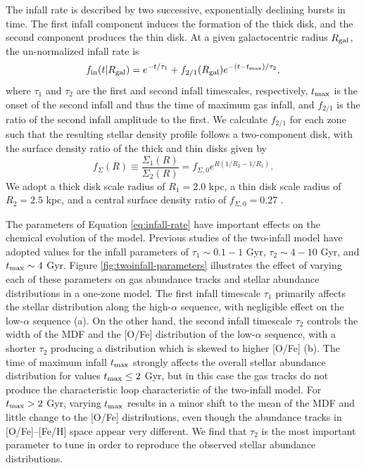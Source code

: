 \documentclass[twocolumn,twocolappendix,linenumbers]{aastex631}
\begin{document}
The infall rate is described by two successive, exponentially declining bursts in time. The first infall component induces the formation of the thick disk, and the second component produces the thin disk. At a given galactocentric radius $R_{\rm gal}$, the un-normalized infall rate is
\begin{equation}
    \label{eq:twoinfall-ifr}
    f_{\rm in}(t|R_{\rm gal}) = e^{-t/\tau_1} + f_{2/1}(R_{\rm gal}) e^{-(t-t_{\rm max})/\tau_2},
\end{equation}
where $\tau_1$ and $\tau_2$ are the first and second infall timescales, respectively, $t_{\rm max}$ is the onset of the second infall and thus the time of maximum gas infall, and $f_{2/1}$ is the ratio of the second infall amplitude to the first. We calculate $f_{2/1}$ for each zone such that the resulting stellar density profile follows a two-component disk, with the surface density ratio of the thick and thin disks given by
\begin{equation}
    f_\Sigma(R) \equiv \frac{\Sigma_1(R)}{\Sigma_2(R)} = f_{\Sigma,0} e^{R(1/R_2 - 1/R_1)}.
\end{equation}
We adopt a thick disk scale radius of $R_1=2.0$ kpc, a thin disk scale radius of $R_2=2.5$ kpc, and a central surface density ratio of $f_{\Sigma,0}=0.27$ \citep{bland-hawthorn_galaxy_2016}.

The parameters of Equation \ref{eq:infall-rate} have important effects on the chemical evolution of the model. Previous studies of the two-infall model have adopted values for the infall parameters of $\tau_1\sim0.1-1$ Gyr, $\tau_2\sim4-10$ Gyr, and $t_{\rm max}\sim4$ Gyr. Figure \ref{fig:twoinfall-parameters} illustrates the effect of varying each of these parameters on gas abundance tracks and stellar abundance distributions in a one-zone model. The first infall timescale $\tau_1$ primarily affects the stellar distribution along the high-$\alpha$ sequence, with negligible effect on the low-$\alpha$ sequence (a). On the other hand, the second infall timescale $\tau_2$ controls the width of the MDF and the [O/Fe] distribution of the low-$\alpha$ sequence, with a shorter $\tau_2$ producing a distribution which is skewed to higher [O/Fe] (b). The time of maximum infall $t_{\rm max}$ strongly affects the overall stellar abundance distribution for values $t_{\rm max}\leq2$ Gyr, but in this case the gas tracks do not produce the characteristic loop characteristic of the two-infall model. For $t_{\rm max}>2$ Gyr, varying $t_{\rm max}$ results in a minor shift to the mean of the MDF and little change to the [O/Fe] distributions, even though the abundance tracks in [O/Fe]--[Fe/H] space appear very different. We find that $\tau_2$ is the most important parameter to tune in order to reproduce the observed stellar abundance distributions.
\end{document}

